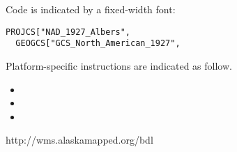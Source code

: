 Code is indicated by a fixed-width font:
\begin{verbatim}
PROJCS["NAD_1927_Albers",
  GEOGCS["GCS_North_American_1927",
\end{verbatim}

Platform-specific instructions are indicated as follow.
\begin{itemize}
\item {} 
\item {} 
\item {}
\end{itemize} 



http://wms.alaskamapped.org/bdl

